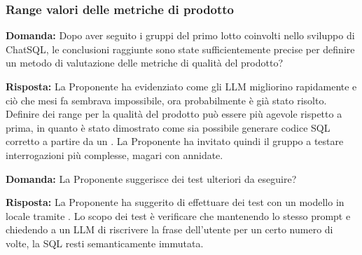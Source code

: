 \subsubsection{Range valori delle metriche di prodotto}

\par \textbf{Domanda:} Dopo aver seguito i gruppi del primo lotto coinvolti nello sviluppo di ChatSQL, le conclusioni raggiunte sono state sufficientemente precise per definire un metodo di valutazione delle metriche di qualità del prodotto?
\par \textbf{Risposta:} La Proponente ha evidenziato come gli LLM migliorino rapidamente e ciò che mesi fa sembrava impossibile, ora probabilmente è già stato risolto. Definire dei range per la qualità del prodotto può essere più agevole rispetto a prima, in quanto è stato dimostrato come sia possibile generare codice SQL corretto a partire da un . La Proponente ha invitato quindi il gruppo a testare interrogazioni più complesse, magari con  annidate.

\par \textbf{Domanda:} La Proponente suggerisce dei test ulteriori da eseguire?
\par \textbf{Risposta:} La Proponente ha suggerito di effettuare dei test con un modello in locale tramite . Lo scopo dei test è verificare che mantenendo lo stesso prompt e chiedendo a un LLM di riscrivere la frase dell'utente per un certo numero di volte, la  SQL resti semanticamente immutata.
